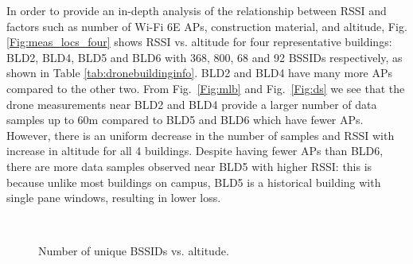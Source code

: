 \documentclass[sigconf,10pt]{acmart}
\begin{document}
In order to provide an in-depth analysis of the relationship between RSSI and factors such as number of Wi-Fi 6E APs, construction material, and altitude, Fig. \ref{Fig:meas_locs_four} shows RSSI vs. altitude for four representative buildings: BLD2, BLD4, BLD5 and BLD6 with 368, 800, 68 and 92 BSSIDs respectively, as shown in Table \ref{tab:dronebuildinginfo}. BLD2 and BLD4 have many more APs compared to the other two. From Fig.~\ref{Fig:mlb} and Fig.~\ref{Fig:ds} we see that the drone measurements near BLD2 and BLD4 provide a larger number of data samples up to 60m compared to BLD5 and BLD6 which have fewer APs. However, there is an uniform decrease in the number of samples and RSSI with increase in altitude for all 4 buildings. Despite having fewer APs than BLD6, there are more data samples observed near BLD5 with higher RSSI: this is because unlike most buildings on campus, BLD5 is a historical building with single pane windows, resulting in lower loss.

\begin{figure}
     \centering
     \begin{subfigure}[-45 dBm RSSI outdoor.]{ 
     \centering
    \texttt{[image: Figures/APLOCDS.png]}
         \label{Fig:APLOCDS}}
    \end{subfigure} \hspace{-7mm}
     \begin{subfigure}[All nine buildings.]{ 
     \centering
    \texttt{[image: Figures/drone\_all\_altit\_uniq\_bssid\_fig.pdf]}
         \label{Fig:DRONE_BSSID1}}
    \end{subfigure} \\ \vspace{-1em}
     \begin{subfigure}[BLD4.]{ 
     \centering
    \texttt{[image: Figures/denta\_all\_altit\_uniq\_bssid\_fig.pdf]}
         \label{Fig:DS_BSSID}2}
    \end{subfigure} \hspace{-8mm}
     \begin{subfigure}[CDF of RSSI.]{
         \centering
         \texttt{[image: Figures/cdfplot\_dentist\_fig.pdf]}
        \label{Fig:DS_CDF}}
     \end{subfigure}
      \vspace{-1em}
    \caption{Number of unique BSSIDs vs. altitude.}
    \label{Fig:ds2}
    \vspace{-2em}
\end{figure}
\end{document}
